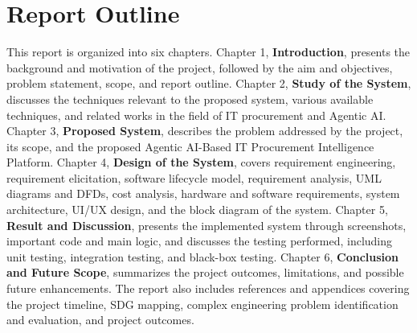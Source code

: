 \section{Report Outline}



This report is organized into six chapters. Chapter 1, \textbf{Introduction}, presents the background and motivation of the project, followed by the aim and objectives, problem statement, scope, and report outline. Chapter 2, \textbf{Study of the System}, discusses the techniques relevant to the proposed system, various available techniques, and related works in the field of IT procurement and Agentic AI. Chapter 3, \textbf{Proposed System}, describes the problem addressed by the project, its scope, and the proposed Agentic AI-Based IT Procurement Intelligence Platform. Chapter 4, \textbf{Design of the System}, covers requirement engineering, requirement elicitation, software lifecycle model, requirement analysis, UML diagrams and DFDs, cost analysis, hardware and software requirements, system architecture, UI/UX design, and the block diagram of the system. Chapter 5, \textbf{Result and Discussion}, presents the implemented system through screenshots, important code and main logic, and discusses the testing performed, including unit testing, integration testing, and black-box testing. Chapter 6, \textbf{Conclusion and Future Scope}, summarizes the project outcomes, limitations, and possible future enhancements. The report also includes references and appendices covering the project timeline, SDG mapping, complex engineering problem identification and evaluation, and project outcomes.




